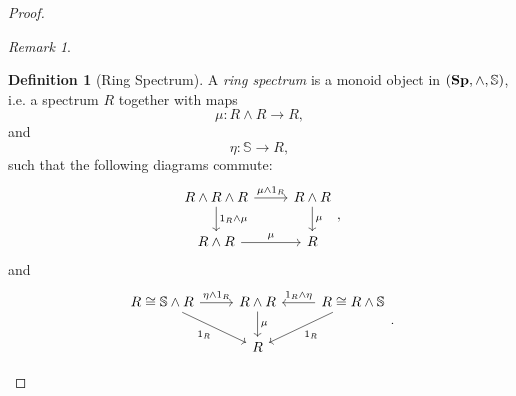 \documentclass[a4paper,english,11pt]{article}
\theoremstyle{definition}
\newtheorem{Def}{Definition}
\theoremstyle{plain}
\theoremstyle{remark}
\newtheorem{rem}{\color{red}Remark}
\newcommand{\Sp}{\textbf{\text{Sp}}}
\begin{document}
\begin{proof}
\begin{rem}
\end{rem}
\begin{Def}[Ring Spectrum]
  A \textit{ring spectrum} is a monoid object in \((\Sp,\wedge, \mathbb{S})\), i.e. a spectrum \(R\) together with maps
  \[\mu:R\wedge R\to R,\]
  and
  \[\eta:\mathbb{S}\to R,\]
  such that the following diagrams commute:
  \begin{equation*}
    \begin{tikzcd}
      R\wedge R\wedge R\arrow{r}{\mu\wedge 1_R}\arrow{d}{1_R\wedge \mu}& R\wedge R\arrow{d}{\mu}\\
      R\wedge R\arrow{r}{\mu}& R
    \end{tikzcd},
  \end{equation*}
  and
  \begin{equation*}
    \begin{tikzcd}
      R\cong \mathbb{S}\wedge R\arrow{r}{\eta\wedge 1_R}\arrow{dr}[swap]{1_R}& R\wedge R\arrow{d}{\mu}&R\cong R\wedge \mathbb{S}\arrow{l}[swap]{1_R\wedge \eta}\arrow{dl}{1_R}\\
      &R&
    \end{tikzcd}.
  \end{equation*}

\end{Def}
\end{proof}
\end{document}

